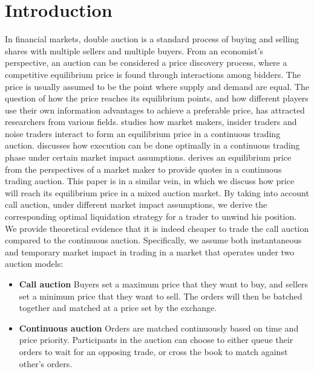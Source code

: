 \documentclass{article}
\begin{document}
\section{Introduction}
In financial markets, double auction is a standard process of buying and selling shares with multiple sellers and multiple buyers. From an economist's perspective, an auction can be considered a price discovery process, where a competitive equilibrium price is found through interactions among bidders. The price is usually assumed to be the point where supply and demand are equal. The question of how the price reaches its equilibrium points, and how different players use their own information advantages to achieve a preferable price, has attracted researchers from various fields. \cite{Kyle1985} studies how market makers, insider traders and noise traders interact to form an equilibrium price in a continuous trading auction. \cite{AlmgrenChriss2000} discusses how execution can be done optimally in a continuous trading phase under certain market impact assumptions. \cite{Avellaneda2008} derives an equilibrium price from the perspectives of a market maker to provide quotes in a continuous trading auction. This paper is in a similar vein, in which we discuss how price will reach its equilibrium price in a mixed auction market. By taking into account call auction, under different market impact assumptions, we derive the corresponding optimal liquidation strategy for a trader to unwind his position. We provide theoretical evidence that it is indeed cheaper to trade the call auction compared to the continuous auction. Specifically, we assume both instantaneous and temporary market impact in trading in a market that operates under two auction models:
\begin{itemize}
  \item \textbf{Call auction} Buyers set a maximum price that they want to buy, and sellers set a minimum price that they want to sell. The orders will then be batched together and matched at a price set by the exchange.
  \item \textbf{Continuous auction} Orders are matched continuously based on time and price priority. Participants in the auction can choose to either queue their orders to wait for an opposing trade, or cross the book to match against other's orders.
\end{itemize}
\end{document}
